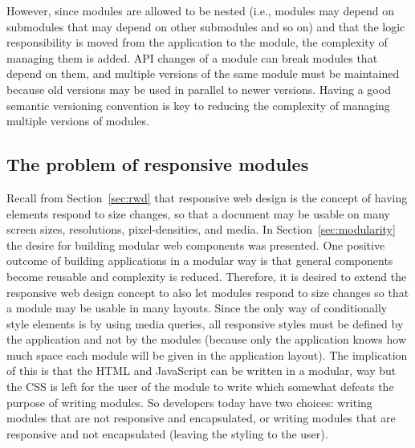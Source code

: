 \documentclass[a4paper,11pt]{kth-mag}
\begin{document}
        However, since modules are allowed to be nested (i.e., modules may depend on submodules that may depend on other submodules and so on) and that the logic responsibility is moved from the application to the module, the complexity of managing them is added.
        \gls{API} changes of a module can break modules that depend on them, and multiple versions of the same module must be maintained because old versions may be used in parallel to newer versions.
        Having a good semantic versioning convention is key to reducing the complexity of managing multiple versions of modules.

      \subsection{The problem of responsive modules}\label{sec:rwd-modular-problem}
        Recall from Section~\ref{sec:rwd} that \gls{responsive} \gls{web} design is the concept of having \glspl{element} respond to size changes, so that a document may be usable on many screen sizes, resolutions, pixel-densities, and media.
        In Section~\ref{sec:modularity} the desire for building modular \gls{web} components was presented.
        One positive outcome of building applications in a modular way is that general components become reusable and complexity is reduced.
        Therefore, it is desired to extend the responsive web design concept to also let modules respond to size changes so that a module may be usable in many layouts.
        Since the only way of conditionally style \glspl{element} is by using \gls{media queries}, all \gls{responsive} styles must be defined by the application and not by the modules (because only the application knows how much space each module will be given in the application layout).
        The implication of this is that the \gls{HTML} and \gls{JavaScript} can be written in a modular, way but the \gls{CSS} is left for the user of the module to write which somewhat defeats the purpose of writing modules.
        So developers today have two choices: writing modules that are not \gls{responsive} and \gls{encapsulated}, or writing modules that are \gls{responsive} and not \gls{encapsulated} (leaving the styling to the user).        
\end{document}
